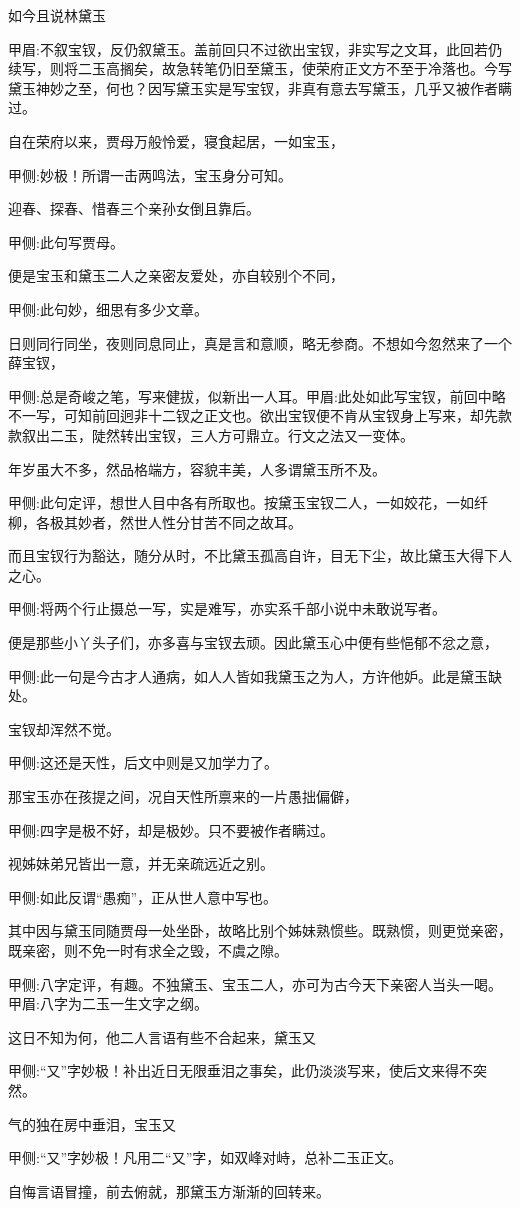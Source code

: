 \begin{parag}
    如今且说林黛玉\begin{note}甲眉:不叙宝钗，反仍叙黛玉。盖前回只不过欲出宝钗，非实写之文耳，此回若仍续写，则将二玉高搁矣，故急转笔仍旧至黛玉，使荣府正文方不至于冷落也。今写黛玉神妙之至，何也？因写黛玉实是写宝钗，非真有意去写黛玉，几乎又被作者瞒过。\end{note}自在荣府以来，贾母万般怜爱，寝食起居，一如宝玉，\begin{note}甲侧:妙极！所谓一击两鸣法，宝玉身分可知。\end{note}迎春、探春、惜春三个亲孙女倒且靠后。\begin{note}甲侧:此句写贾母。\end{note}便是宝玉和黛玉二人之亲密友爱处，亦自较别个不同，\begin{note}甲侧:此句妙，细思有多少文章。\end{note}日则同行同坐，夜则同息同止，真是言和意顺，略无参商。不想如今忽然来了一个薛宝钗，\begin{note}甲侧:总是奇峻之笔，写来健拔，似新出一人耳。甲眉:此处如此写宝钗，前回中略不一写，可知前回迥非十二钗之正文也。欲出宝钗便不肯从宝钗身上写来，却先款款叙出二玉，陡然转出宝钗，三人方可鼎立。行文之法又一变体。\end{note}年岁虽大不多，然品格端方，容貌丰美，人多谓黛玉所不及。\begin{note}甲侧:此句定评，想世人目中各有所取也。按黛玉宝钗二人，一如姣花，一如纤柳，各极其妙者，然世人性分甘苦不同之故耳。\end{note}而且宝钗行为豁达，随分从时，不比黛玉孤高自许，目无下尘，故比黛玉大得下人之心。\begin{note}甲侧:将两个行止摄总一写，实是难写，亦实系千部小说中未敢说写者。\end{note}便是那些小丫头子们，亦多喜与宝钗去顽。因此黛玉心中便有些悒郁不忿之意，\begin{note}甲侧:此一句是今古才人通病，如人人皆如我黛玉之为人，方许他妒。此是黛玉缺处。\end{note}宝钗却浑然不觉。\begin{note}甲侧:这还是天性，后文中则是又加学力了。\end{note}那宝玉亦在孩提之间，况自天性所禀来的一片愚拙偏僻，\begin{note}甲侧:四字是极不好，却是极妙。只不要被作者瞒过。\end{note}视姊妹弟兄皆出一意，并无亲疏远近之别。\begin{note}甲侧:如此反谓“愚痴”，正从世人意中写也。\end{note}其中因与黛玉同随贾母一处坐卧，故略比别个姊妹熟惯些。既熟惯，则更觉亲密，既亲密，则不免一时有求全之毁，不虞之隙。\begin{note}甲侧:八字定评，有趣。不独黛玉、宝玉二人，亦可为古今天下亲密人当头一喝。甲眉:八字为二玉一生文字之纲。\end{note}这日不知为何，他二人言语有些不合起来，黛玉又\begin{note}甲侧:“又”字妙极！补出近日无限垂泪之事矣，此仍淡淡写来，使后文来得不突然。\end{note}气的独在房中垂泪，宝玉又\begin{note}甲侧:“又”字妙极！凡用二“又”字，如双峰对峙，总补二玉正文。\end{note}自悔言语冒撞，前去俯就，那黛玉方渐渐的回转来。

\end{parag}
